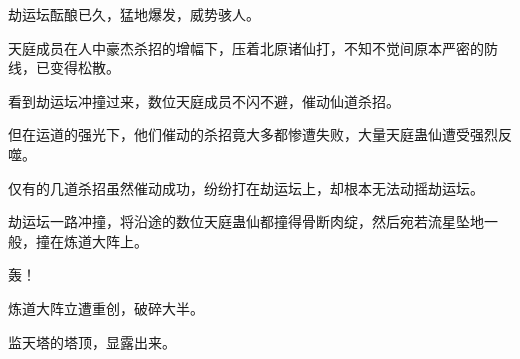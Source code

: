 \begin{this_body}
劫运坛酝酿已久，猛地爆发，威势骇人。

天庭成员在人中豪杰杀招的增幅下，压着北原诸仙打，不知不觉间原本严密的防线，已变得松散。

看到劫运坛冲撞过来，数位天庭成员不闪不避，催动仙道杀招。

但在运道的强光下，他们催动的杀招竟大多都惨遭失败，大量天庭蛊仙遭受强烈反噬。

仅有的几道杀招虽然催动成功，纷纷打在劫运坛上，却根本无法动摇劫运坛。

劫运坛一路冲撞，将沿途的数位天庭蛊仙都撞得骨断肉绽，然后宛若流星坠地一般，撞在炼道大阵上。

轰！

炼道大阵立遭重创，破碎大半。

监天塔的塔顶，显露出来。

\end{this_body}


